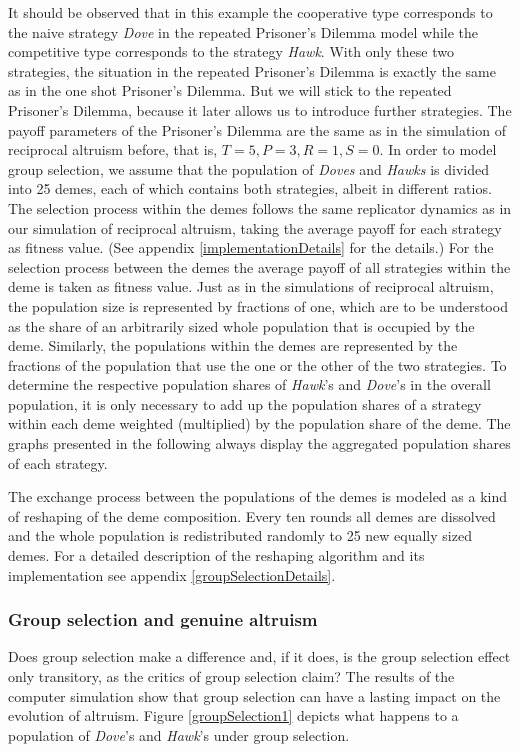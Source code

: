 It should be observed that in this example the cooperative type corresponds to
the naive strategy {\em Dove} in the repeated Prisoner's Dilemma model while
the competitive type corresponds to the strategy {\em Hawk}. With only these
two strategies, the situation in the repeated Prisoner's Dilemma is exactly
the same as in the one shot Prisoner's Dilemma. But we will stick to the
repeated Prisoner's Dilemma, because it later allows us to introduce further
strategies.  The payoff parameters of the Prisoner's Dilemma are the same as
in the simulation of reciprocal altruism before, that is, $T=5, P=3, R=1, S=0$.
In order to model group selection, we assume that the population of {\em
  Doves} and {\em Hawks} is divided into 25 demes, each of which contains both
strategies, albeit in different ratios. The selection process within the demes
follows the same replicator dynamics as in our simulation of reciprocal
altruism, taking the average payoff for each strategy as fitness value. (See
appendix \ref{implementationDetails} for the details.) For the selection
process between the demes the average payoff of all strategies within the deme
is taken as fitness value. Just as in the simulations of reciprocal altruism,
the population size is represented by fractions of one, which are to be
understood as the share of an arbitrarily sized whole population that is
occupied by the deme. Similarly, the populations within the demes are
represented by the fractions of the population that use the one or the other
of the two strategies.  To determine the respective population shares of {\em
  Hawk}'s and {\em Dove}'s in the overall population, it is only necessary to
add up the population shares of a strategy within each deme weighted
(multiplied) by the population share of the deme. The graphs presented in the
following always display the aggregated population shares of each strategy.

The exchange process between the populations of the demes is modeled as a
kind of reshaping of the deme composition. Every ten rounds all demes are
dissolved and the whole population is redistributed randomly to 25 new equally
sized demes. For a detailed description of the reshaping algorithm and its
implementation see appendix \ref{groupSelectionDetails}.

\subsubsection{Group selection and genuine altruism}

Does group selection make a difference and, if it does, is the group selection
effect only transitory, as the critics of group selection claim? The results
of the computer simulation show that group selection can have a lasting impact
on the evolution of altruism. Figure \ref{groupSelection1} depicts what
happens to a population of {\em Dove}'s and {\em Hawk}'s under group
selection.

